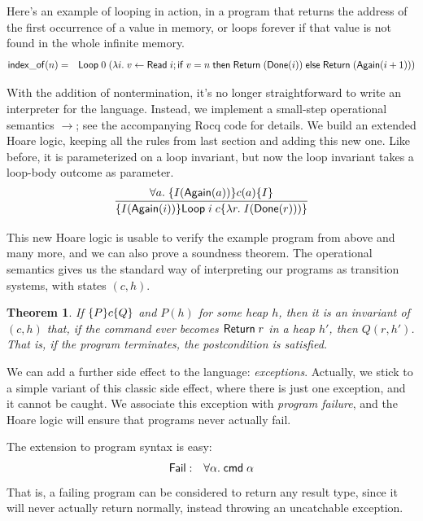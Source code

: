 \documentclass{amsbook}
\newtheorem{theorem}{Theorem}[chapter]
\theoremstyle{definition}
\theoremstyle{remark}
\numberwithin{section}{chapter}
\numberwithin{equation}{chapter}
\begin{document}
Here's an example of looping in action, in a program that returns the address of the first occurrence of a value in memory, or loops forever if that value is not found in the whole infinite memory.
\begin{eqnarray*}
  \mathsf{index\_of}(n) &=& \mathsf{Loop} \; 0 \; (\lambda i. \; v \leftarrow \mathsf{Read} \; i; \mathsf{if} \; v = n \; \mathsf{then} \; \mathsf{Return} \; (\mathsf{Done}(i)) \; \mathsf{else} \; \mathsf{Return} \; (\mathsf{Again}(i+1)))
\end{eqnarray*}

With the addition of nontermination, it's no longer straightforward to write an interpreter for the language.
Instead, we implement a small-step operational semantics $\to$; see the accompanying Rocq code for details.
We build an extended Hoare logic, keeping all the rules from last section and adding this new one.
\invariants
Like before, it is parameterized on a loop invariant, but now the loop invariant takes a loop-body outcome as parameter.
$$\infer{\hoare{I(\mt{Again}(i))}{\mt{Loop} \; i \; c}{\lambda r. \; I(\mt{Done}(r)))}}{
  \forall a. \; \hoare{I(\mt{Again}(a))}{c(a)}{I}
}$$

This new Hoare logic is usable to verify the example program from above and many more, and we can also prove a soundness theorem.
The operational semantics gives us the standard way of interpreting our programs as transition systems, with states $(c, h)$.

\invariants
\begin{theorem}
  If $\{P\} c \{Q\}$ and $P(h)$ for some heap $h$, then it is an invariant of $(c, h)$ that, if the command ever becomes $\mathsf{Return} \; r$ in a heap $h'$, then $Q(r, h')$.  That is, if the program terminates, the postcondition is satisfied.
\end{theorem}

We can add a further side effect to the language: \emph{exceptions}.
Actually, we stick to a simple variant of this classic side effect, where there is just one exception, and it cannot be caught.
We associate this exception with \emph{program failure}, and the Hoare logic will ensure that programs never actually fail.

The extension to program syntax is easy:
\begin{eqnarray*}
  \mathsf{Fail} &:& \forall \alpha. \; \mathsf{cmd} \; \alpha
\end{eqnarray*}
That is, a failing program can be considered to return any result type, since it will never actually return normally, instead throwing an uncatchable exception.
\end{document}
